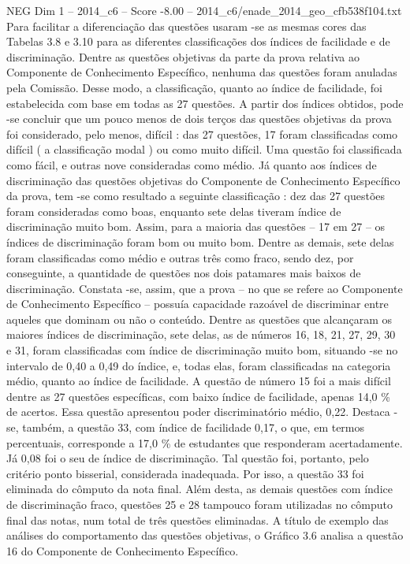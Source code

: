 \begin{textsample}{NEG Dim 1 – 2014\_c6 – Score -8.00 – 2014\_c6/enade\_2014\_geo\_cfb538f104.txt}
Para facilitar a diferenciação das questões usaram -se as mesmas cores das Tabelas 3.8 e 3.10 para as diferentes classificações dos índices de facilidade e de discriminação.
Dentre as questões objetivas da parte da prova relativa ao Componente de Conhecimento Específico, nenhuma das questões foram anuladas pela Comissão.
Desse modo, a classificação, quanto ao índice de facilidade, foi estabelecida com base em todas as 27 questões.
A partir dos índices obtidos, pode -se concluir que um pouco menos de dois terços das questões objetivas da prova foi considerado, pelo menos, difícil : das 27 questões, 17 foram classificadas como difícil ( a classificação modal ) ou como muito difícil.
Uma questão foi classificada como fácil, e outras nove consideradas como médio.
Já quanto aos índices de discriminação das questões objetivas do Componente de Conhecimento Específico da prova, tem -se como resultado a seguinte classificação : dez das 27 questões foram consideradas como boas, enquanto sete delas tiveram índice de discriminação muito bom.
Assim, para a maioria das questões – 17 em 27 – os índices de discriminação foram bom ou muito bom.
Dentre as demais, sete delas foram classificadas como médio e outras três como fraco, sendo dez, por conseguinte, a quantidade de questões nos dois patamares mais baixos de discriminação.
Constata -se, assim, que a prova – no que se refere ao Componente de Conhecimento Específico – possuía capacidade razoável de discriminar entre aqueles que dominam ou não o conteúdo.
Dentre as questões que alcançaram os maiores índices de discriminação, sete delas, as de números 16, 18, 21, 27, 29, 30 e 31, foram classificadas com índice de discriminação muito bom, situando -se no intervalo de 0,40 a 0,49 do índice, e, todas elas, foram classificadas na categoria médio, quanto ao índice de facilidade.
A questão de número 15 foi a mais difícil dentre as 27 questões específicas, com baixo índice de facilidade, apenas 14,0 \% de acertos.
Essa questão apresentou poder discriminatório médio, 0,22.
Destaca -se, também, a questão 33, com índice de facilidade 0,17, o que, em termos percentuais, corresponde a 17,0 \% de estudantes que responderam acertadamente.
Já 0,08 foi o seu de índice de discriminação.
Tal questão foi, portanto, pelo critério ponto bisserial, considerada inadequada.
Por isso, a questão 33 foi eliminada do cômputo da nota final.
Além desta, as demais questões com índice de discriminação fraco, questões 25 e 28 tampouco foram utilizadas no cômputo final das notas, num total de três questões eliminadas.
A título de exemplo das análises do comportamento das questões objetivas, o Gráfico 3.6 analisa a questão 16 do Componente de Conhecimento Específico.

\end{textsample}
